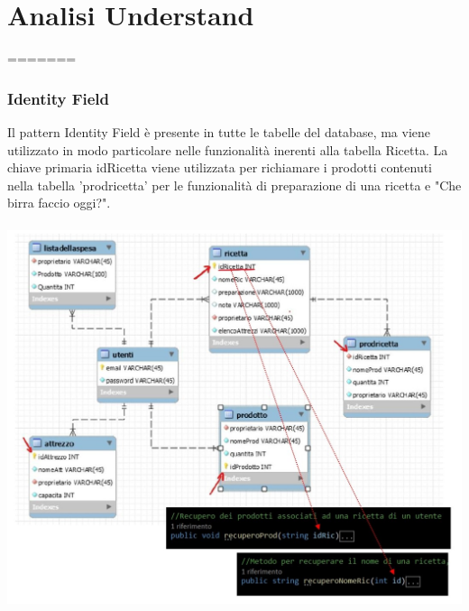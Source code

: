 \documentclass[a4paper, titlepage]{article}
\begin{document}
\section{Analisi Understand}
=======
\subsubsection{Identity Field}
Il pattern Identity Field è presente in tutte le tabelle del database, ma viene utilizzato in modo particolare nelle funzionalità inerenti alla tabella Ricetta.
La chiave primaria idRicetta viene utilizzata per richiamare i prodotti contenuti nella tabella 'prodricetta' per le funzionalità di preparazione di una ricetta e "Che birra faccio oggi?".\\\\
\includegraphics[scale=0.40]{Immagini/IdentityField.jpg}
\end{document}
